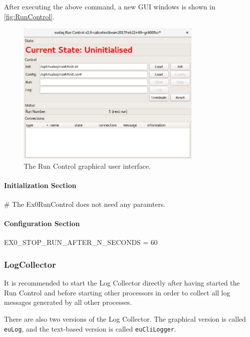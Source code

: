 After executing the above command, a new GUI windows is shown in \autoref{fig:RunControl}.
\begin{figure}[htb]
  \begin{center}
    \includegraphics[width=0.8\textwidth]{src/images/RunControl}
    \caption{The Run Control graphical user interface.}
    \label{fig:RunControl}
  \end{center}
\end{figure}

\paragraph{Initialization Section}
\begin{listing}[conf]
[RunControl]
# The Ex0RunControl does not need any paramters.
\end{listing}

\paragraph{Configuration Section}
\begin{listing}[conf]
[RunControl]
EX0_STOP_RUN_AFTER_N_SECONDS = 60
\end{listing}

\subsubsection{LogCollector}
\label{sec:logcollector}
It is recommended to start the Log Collector directly after having started the Run Control and before starting other processors in order to collect all log messages generated by all other processes.

There are also two versions of the Log Collector.
The graphical version is called \texttt{euLog},
and the text-based version is called \texttt{euCliLogger}.

